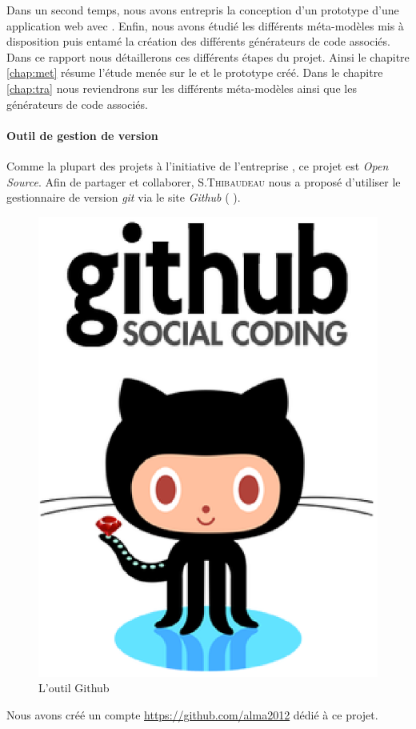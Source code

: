 \clearpage

Dans un second temps, nous avons entrepris la conception d'un prototype d'une application web avec \kwplay{}. Enfin, nous avons étudié les différents méta-modèles mis à disposition puis entamé la création des différents générateurs de code associés. Dans ce rapport nous détaillerons ces différents étapes du projet. Ainsi le chapitre \ref{chap:met} résume l'étude menée sur le \kwplay{} et le prototype créé. Dans le chapitre \ref{chap:tra} nous reviendrons sur les différents méta-modèles ainsi que les générateurs de code associés. 

\paragraph{Outil de gestion de version}
Comme la plupart des projets à l'initiative de l'entreprise \kwobeo, ce projet est \textit{Open Source}. Afin de partager et collaborer, S.\textsc{Thibaudeau} nous a proposé d'utiliser le gestionnaire de version \emph{git} via le site \emph{Github} (\cf{} \cite{git}).%
\begin{figure}[htb]
  \centering
  \includegraphics[scale=.3]{img/git.eps}
  \caption{L'outil Github}
\end{figure}
Nous avons créé un compte \href{alma2012}{https://github.com/alma2012} dédié à ce projet.


